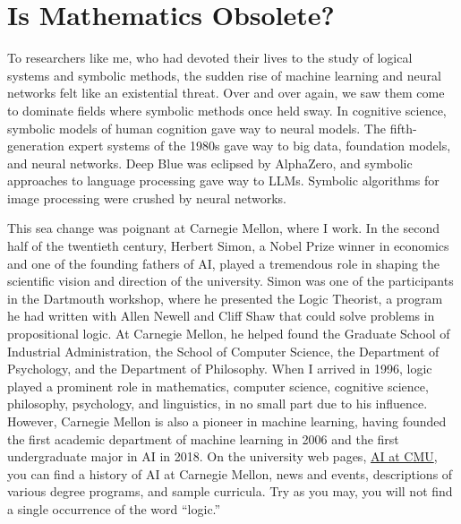\documentclass[11pt]{article}
\begin{document}
\section{Is Mathematics Obsolete?}

To researchers like me, who had devoted their lives to the study of logical systems and symbolic methods, the sudden rise of machine learning and neural networks felt like an existential threat. Over and over again, we saw them come to dominate fields where symbolic methods once held sway. In cognitive science, symbolic models of human cognition gave way to neural models. The fifth-generation expert systems of the 1980s gave way to big data, foundation models, and neural networks. Deep Blue was eclipsed by AlphaZero, and symbolic approaches to language processing gave way to LLMs. Symbolic algorithms for image processing were crushed by neural networks.

This sea change was poignant at Carnegie Mellon, where I work. In the second half of the twentieth century, Herbert Simon, a Nobel Prize winner in economics and one of the founding fathers of AI, played a tremendous role in shaping the scientific vision and direction of the university. Simon was one of the participants in the Dartmouth workshop, where he presented the Logic Theorist, a program he had written with Allen Newell and Cliff Shaw that could solve problems in propositional logic. At Carnegie Mellon, he helped found the Graduate School of Industrial Administration, the School of Computer Science, the Department of Psychology, and the Department of Philosophy. When I arrived in 1996, logic played a prominent role in mathematics, computer science, cognitive science, philosophy, psychology, and linguistics, in no small part due to his influence. However, Carnegie Mellon is also a pioneer in machine learning, having founded the first academic department of machine learning in 2006 and the first undergraduate major in AI in 2018. On the university web pages, \href{https://ai.cmu.edu/}{AI at CMU}, you can find a history of AI at Carnegie Mellon, news and events, descriptions of various degree programs, and sample curricula. Try as you may, you will not find a single occurrence of the word ``logic.''
\end{document}
